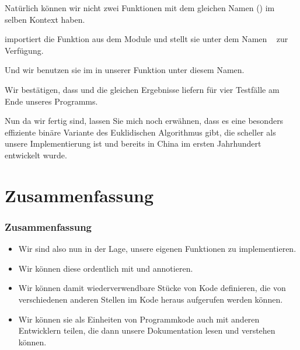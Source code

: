 \documentclass[aspectratio=169,mathserif,notheorems]{beamer}%
\begin{document}
\begin{frame}[t]
{{\begin{itemize}
{\item<33-> Natürlich können wir nicht zwei Funktionen mit dem gleichen Namen () im selben Kontext haben.%
}%
%
%
%
\item<35->   importiert die Funktion  aus dem Module  und stellt sie unter dem Namen ~ zur Verfügung.%
%
\item<36-> Und wir benutzen sie im  in unserer Funktion  unter diesem Namen.%
%
\item<37-> Wir bestätigen, dass  und  die gleichen Ergebnisse liefern für vier Testfälle am Ende unseres Programms.%
%
\item<38-> Nun da wir fertig sind, lassen Sie mich noch erwähnen, dass es eine besonders effiziente binäre Variante des Euklidischen Algorithmus gibt, die scheller als unsere Implementierung ist und bereits in China im ersten Jahrhundert~ entwickelt wurde\cite{B1999FAOTBEA}.%
%
\end{itemize}%
}}%
%
%
%
\end{frame}%
%
\section{Zusammenfassung}%
%
\begin{frame}%
\frametitle{Zusammenfassung}%
\begin{itemize}%
\item Wir sind also nun in der Lage, unsere eigenen Funktionen zu implementieren.%
\item<2-> Wir können diese ordentlich mit  und  annotieren.%
\item<3-> Wir können damit wiederverwendbare Stücke von Kode definieren, die von verschiedenen anderen Stellen im Kode heraus aufgerufen werden können.%
\item<4-> Wir können sie als Einheiten von Programmkode auch mit anderen Entwicklern teilen, die dann unsere Dokumentation lesen und verstehen können.%
\end{itemize}%
\end{frame}%
%
\endPresentation%
\end{document}
